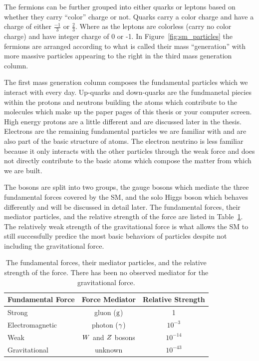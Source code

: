 The fermions can be further grouped into either quarks or leptons based on whether
they carry ``color'' charge or not. 
Quarks carry a color charge and have a charge of either $\frac{-1}{3}$ or $\frac{2}{3}$. 
Where as the leptons are colorless (carry no color charge) and
have integer charge of 0 or -1. In Figure~\ref{fig:sm_particles} the fermions are
arranged according to what is called their mass ``generation'' with more massive
particles appearing to the right in the third mass generation column.

The first
mass generation column composes the fundamental particles which we interact with
every day. Up-quarks and down-quarks are the fundmanetal piecies within
the protons and neutrons building the atoms which contribute to the molecules which
make up the paper pages of this thesis or your computer screen. High energy protons
are a little different and are discussed later in the thesis. Electrons are the
remaining fundamental particles we are familiar with and are also part of the basic 
structure of atoms. The electron neutrino is less familiar because it only
interacts with the other particles through the weak force and does not directly
contribute to the basic atoms which compose the matter from which we are built.

The bosons are split into two groups, the gauge bosons which mediate the three fundamental
forces covered by the SM, and the solo Higgs boson which behaves differently
and will be discussed in detail later. 
The fundamental forces, their mediator particles, and the relative strength of the force
are listed in Table~\ref{tab:sm_forces}. The relatively weak strength of the gravitational
force is what allows the SM to still successfully predice the most basic behaviors
of particles despite not including the gravitational force.

\begin{table}[htbp]
\centering
\begin{tabular}{lcc}
Fundamental Force        &    Force Mediator             & Relative Strength   \\
\hline
Strong                   &    gluon ($\text{g}$)              &   1                 \\ 
Electromagnetic          &    photon ($\gamma$)            &   $10^{-3}$         \\ 
Weak                     &    $W$ and $Z$ bosons     &   $10^{-14}$        \\ 
Gravitational            &    unknown                    &   $10^{-43}$        \\ 
\hline
\end{tabular}
\caption{
The fundamental forces, their mediator particles, and the relative strength of the force.
There has been no observed mediator for the gravitational force.
}
\label{tab:sm_forces}
\end{table}

